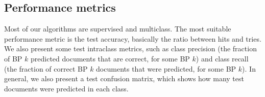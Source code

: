 \subsection{Performance metrics}

    Most of our algorithms are supervised and multiclass. The most suitable performance metric is the test accuracy, basically the ratio between hits and tries. We also present some test intraclass metrics, such as class precision (the fraction of BP $k$ predicted documents that are correct, for some BP $k$) and class recall (the fraction of correct BP $k$ documents that were predicted, for some BP $k$). In general, we also present a test confusion matrix, which shows how many test documents were predicted in each class.
